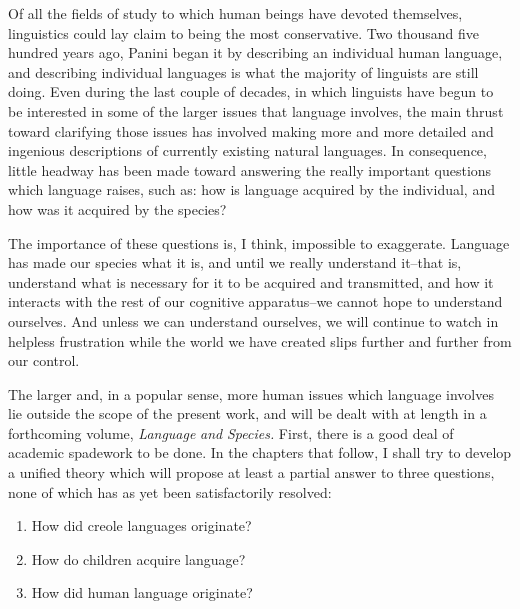 
Of all the fields of study to which human beings have devoted themselves, linguistics could lay claim to being the most conservative. Two thousand five hundred years ago, Panini began it by describing an individual human language, and describing individual languages is what the majority of linguists are still doing. Even during the last couple of decades, in which linguists have begun to be interested in some of the larger issues that language involves, the main thrust toward clarifying those issues has involved making more and more detailed and ingenious descriptions of currently existing natural languages. In consequence, little headway has been made toward answering the really important questions which language raises, such as: how is language acquired by the individual, and how was it acquired by the species?

The importance of these questions is, I think, impossible to exaggerate. Language has made our species what it is, and until we really understand it--that is, understand what is necessary for it to be acquired and transmitted, and how it interacts with the rest of our cognitive apparatus--we cannot hope to understand ourselves. And unless we can understand ourselves, we will continue to watch in helpless frustration while the world we have created slips further and further from our control.

The larger and, in a popular sense, more human issues which language involves lie outside the scope of the present work, and will be dealt with at length in a forthcoming volume, \textit{Language} \textit{and} \textit{Species.} First, there is a good deal of academic spadework to be done. In the chapters that follow, I shall try to develop a unified theory which will propose at least a partial answer to three questions, none of which has as yet been satisfactorily resolved:

\begin{enumerate}
\item How did creole languages originate?
\item How do children acquire language?
\item How did human language originate?
\end{enumerate} 

